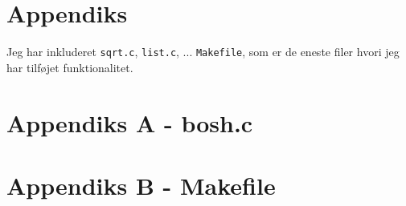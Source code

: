 \documentclass{article}
\begin{document}
\newpage

\section*{Appendiks}
Jeg har inkluderet \texttt{sqrt.c}, \texttt{list.c}, ...  \texttt{Makefile}, som er de eneste filer hvori jeg har tilføjet funktionalitet.

\section*{Appendiks A - bosh.c}


\newpage

\section*{Appendiks B - Makefile}

\end{document}
